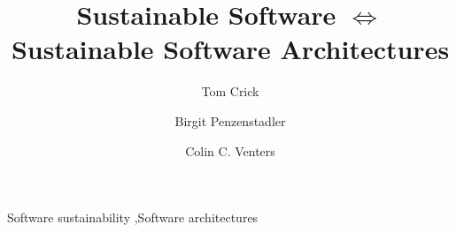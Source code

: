 \documentclass[preprint,12pt,authoryear]{elsarticle}
\begin{document}
\begin{frontmatter}



\title{Sustainable Software $\iff$ Sustainable Software Architectures}


\author[cmu]{Tom Crick}
\author[csu]{Birgit Penzenstadler}
\author[hudd]{Colin C. Venters}
\address[cmu]{Department of Computing \& Information Systems, Cardiff
  Metropolitan University, UK}
\address[csu]{California State University, Long Beach, USA}
\address[hudd]{School of Computing and Engineering, University of
  Huddersfield, UK}


\begin{abstract}

\end{abstract}

\begin{keyword}
Software sustainability \sep Software architectures


\end{keyword}

\end{frontmatter}
\end{document}
